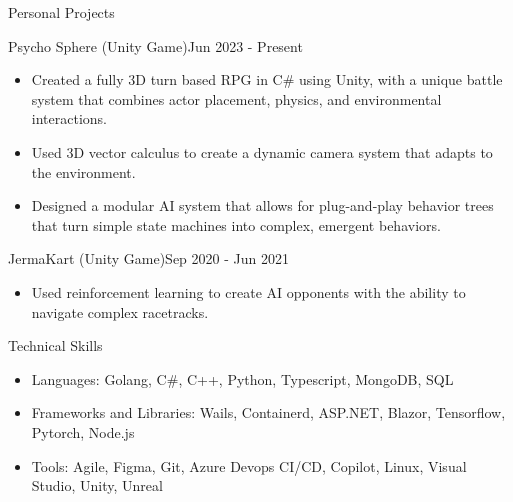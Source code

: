 \documentclass[]{mcdowellcv}
\begin{document}
\begin{cvsection}{Personal Projects}
  	\begin{cvsubsection}{Psycho Sphere (Unity Game)}{}{Jun 2023 - Present}
        \vspace{-5pt}
        \begin{itemize}
          \item Created a fully 3D turn based RPG in C\# using Unity, with a unique battle system that combines actor placement, physics, and environmental interactions.
          \item Used 3D vector calculus to create a dynamic camera system that adapts to the environment.
          \item Designed a modular AI system that allows for plug-and-play behavior trees that turn simple state machines into complex, emergent behaviors.
        \end{itemize}
	\end{cvsubsection}
         \vspace{-4pt}
  	\begin{cvsubsection}{JermaKart (Unity Game)}{}{Sep 2020 - Jun 2021}
        \vspace{-5pt}
        \begin{itemize}
          \item Used reinforcement learning to create AI opponents with the ability to navigate complex racetracks.
        \end{itemize}
	\end{cvsubsection}
 \vspace{-6pt}
\end{cvsection}
\begin{cvsection}{Technical Skills}
	\begin{cvsubsection}{}{}{}
		\begin{itemize}
			\item Languages: Golang, C\#, C++, Python, Typescript, MongoDB, SQL
			\item Frameworks and Libraries: Wails, Containerd, ASP.NET, Blazor, Tensorflow, Pytorch, Node.js
			\item Tools: Agile, Figma, Git, Azure Devops CI/CD, Copilot, Linux, Visual Studio, Unity, Unreal
		\end{itemize}
	\end{cvsubsection}
\end{cvsection}
\end{document}
